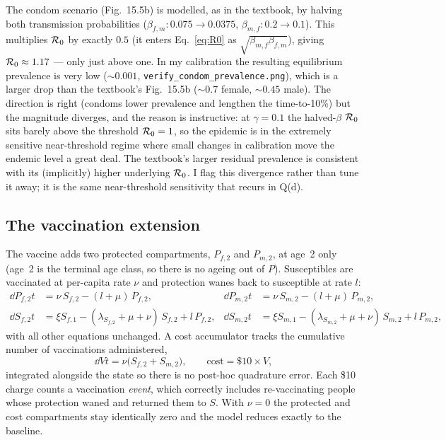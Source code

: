 The condom scenario (Fig.~15.5b) is modelled, as in the textbook, by halving both
transmission probabilities ($\beta_{f,m}:0.075\to0.0375$,
$\beta_{m,f}:0.2\to0.1$). This multiplies $\mathcal{R}_0$ by exactly $0.5$ (it enters
Eq.~\ref{eq:R0} as $\sqrt{\beta_{m,f}\beta_{f,m}}$), giving $\mathcal{R}_0\approx1.17$ ---
only just above one. In my calibration the resulting equilibrium prevalence is very
low ($\sim\!0.001$, \verb|verify_condom_prevalence.png|), which is a larger drop
than the textbook's Fig.~15.5b ($\sim\!0.7$ female, $\sim\!0.45$ male). The
direction is right (condoms lower prevalence and lengthen the time-to-10\%) but the
magnitude diverges, and the reason is instructive: at $\gamma=0.1$ the halved-$\beta$
$\mathcal{R}_0$ sits barely above the threshold $\mathcal{R}_0=1$, so the epidemic is in the
extremely sensitive near-threshold regime where small changes in calibration move
the endemic level a great deal. The textbook's larger residual prevalence is
consistent with its (implicitly) higher underlying $\mathcal{R}_0$. I flag this divergence
rather than tune it away; it is the same near-threshold sensitivity that recurs in
Q(d).

\subsection{The vaccination extension}

The vaccine adds two protected compartments, $P_{f,2}$ and $P_{m,2}$, at age~2 only
(age~2 is the terminal age class, so there is no ageing out of $P$). Susceptibles
are vaccinated at per-capita rate $\nu$ and protection wanes back to susceptible at
rate $l$:
\begin{align}
\dd{P_{f,2}}{t} &= \nu\,S_{f,2} - (l+\mu)\,P_{f,2}, &
\dd{P_{m,2}}{t} &= \nu\,S_{m,2} - (l+\mu)\,P_{m,2}, \\
\dd{S_{f,2}}{t} &= \xi S_{f,1} - (\lambda_{S_{f,2}}+\mu+\nu)\,S_{f,2} + l\,P_{f,2}, &
\dd{S_{m,2}}{t} &= \xi S_{m,1} - (\lambda_{S_{m,2}}+\mu+\nu)\,S_{m,2} + l\,P_{m,2},
\end{align}
with all other equations unchanged. A cost accumulator tracks the cumulative number
of vaccinations administered,
\begin{equation}
\dd{V}{t} = \nu\bigl(S_{f,2}+S_{m,2}\bigr),
\qquad \text{cost} = \$10\times V,
\label{eq:cost}
\end{equation}
integrated alongside the state so there is no post-hoc quadrature error. Each \$10
charge counts a vaccination \emph{event}, which correctly includes re-vaccinating
people whose protection waned and returned them to $S$. With $\nu=0$ the protected
and cost compartments stay identically zero and the model reduces exactly to the
baseline.

